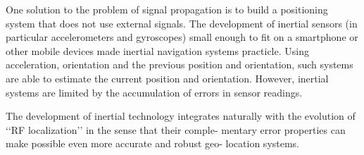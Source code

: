 
One solution to the problem of signal propagation is to build a positioning system that does not use external signals. The development of inertial sensors (in particular accelerometers and gyroscopes) small enough to fit on a smartphone or other mobile devices made inertial navigation systems practicle. Using acceleration, orientation and the previous position and orientation, such systems are able to estimate the current position and orientation. However, inertial systems are limited by the accumulation of errors in sensor readings.

The development of inertial technology integrates
naturally with the evolution of ‘‘RF localization’’ in the sense that their comple-
mentary error properties can make possible even more accurate and robust geo-
location systems.

